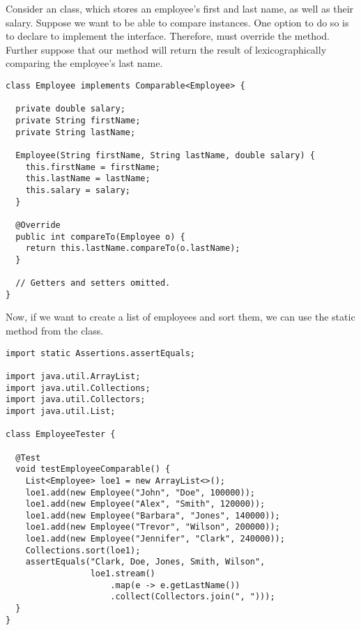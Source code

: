 \newpage %
Consider an  class, which stores an employee's first and last name, as well as their salary. 
Suppose we want to be able to compare  instances. 
One option to do so is to declare  to implement the  interface. 
Therefore,  must override the  method. 
Further suppose that our method will return the result of lexicographically comparing the employee's last name.

\begin{lstlisting}[language=MyJava]
class Employee implements Comparable<Employee> {

  private double salary;
  private String firstName;
  private String lastName;

  Employee(String firstName, String lastName, double salary) {
    this.firstName = firstName;
    this.lastName = lastName;
    this.salary = salary;
  }

  @Override
  public int compareTo(Employee o) {
    return this.lastName.compareTo(o.lastName);
  }

  // Getters and setters omitted.
}
\end{lstlisting}

Now, if we want to create a list of employees and sort them, we can use the static  method from the  class. 

\begin{lstlisting}[language=MyJava]
import static Assertions.assertEquals;

import java.util.ArrayList;
import java.util.Collections;
import java.util.Collectors;
import java.util.List;

class EmployeeTester {

  @Test
  void testEmployeeComparable() {
    List<Employee> loe1 = new ArrayList<>();
    loe1.add(new Employee("John", "Doe", 100000));
    loe1.add(new Employee("Alex", "Smith", 120000));
    loe1.add(new Employee("Barbara", "Jones", 140000));
    loe1.add(new Employee("Trevor", "Wilson", 200000));
    loe1.add(new Employee("Jennifer", "Clark", 240000));
    Collections.sort(loe1);
    assertEquals("Clark, Doe, Jones, Smith, Wilson",
                 loe1.stream()
                     .map(e -> e.getLastName())
                     .collect(Collectors.join(", ")));
  }
}
\end{lstlisting}

